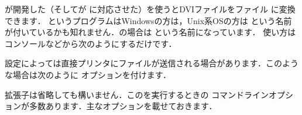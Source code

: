 
が開発した（そしてが
に対応させた）を使うとDVIファイルを\PS ファイル
に変換できます．
というプログラムはWindowsの方は，Unix系OSの方は
という名前が付いているかも知れません．の場合は
という名前になっています．
使い方はコンソールなどから次のようにするだけです．

\begin{InTerm}
\end{InTerm}

設定によっては直接プリンタにファイルが送信される場合があります．このよう
な場合は次のように  オプションを付けます．

\begin{InTerm}
\end{InTerm}

拡張子は省略しても構いません．このを実行するときの%
%
{コマンドラインオプション}が多数あります．主なオプションを載せておきます．

